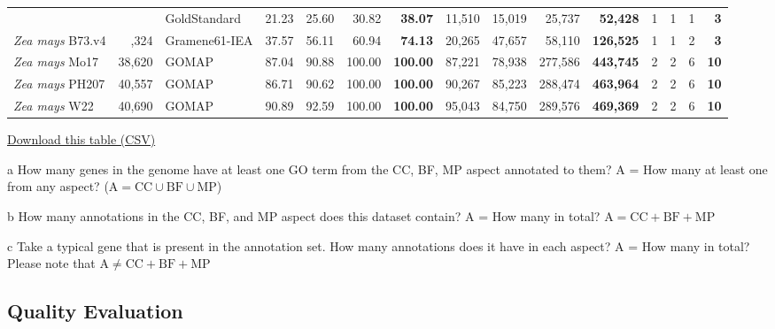 \documentclass[utf8]{frontiersSCNS}
\begin{document}
\begin{table}[t]
{\begin{threeparttable}
\begin{tabular}{lrlrrr>{\bfseries}r|rrr>{\bfseries}r|rrr>{\bfseries}r}
\rowcolor{gray!6}   &  & GoldStandard & 21.23 & 25.60 & 30.82 & 38.07 & 11,510 & 15,019 & 25,737 & 52,428 & 1 & 1 & 1 & 3\\

\multirow{-3}{*}{\raggedright\arraybackslash \textit{Zea mays} B73.v4} & \multirow{-3}{*}{\raggedleft\arraybackslash 39,324} & Gramene61-IEA & 37.57 & 56.11 & 60.94 & 74.13 & 20,265 & 47,657 & 58,110 & 126,525 & 1 & 1 & 2 & 3\\
\cmidrule{1-15}
\rowcolor{gray!6}  \textit{Zea mays} Mo17 & 38,620 & GOMAP & 87.04 & 90.88 & 100.00 & 100.00 & 87,221 & 78,938 & 277,586 & 443,745 & 2 & 2 & 6 & 10\\
\cmidrule{1-15}
\textit{Zea mays} PH207 & 40,557 & GOMAP & 86.71 & 90.62 & 100.00 & 100.00 & 90,267 & 85,223 & 288,474 & 463,964 & 2 & 2 & 6 & 10\\
\cmidrule{1-15}
\rowcolor{gray!6}  \textit{Zea mays} W22 & 40,690 & GOMAP & 90.89 & 92.59 & 100.00 & 100.00 & 95,043 & 84,750 & 289,576 & 469,369 & 2 & 2 & 6 & 10\\
\bottomrule
\end{tabular}
\begin{tablenotes}
\item \href{https://raw.githubusercontent.com/Dill-PICL/GOMAP-Paper-2019.1/master/analyses/quantity/results/quantity_table.csv}{Download this table (CSV)}
\item[a] How many genes in the genome have at least one GO term from the CC, BF, MP aspect annotated to them? A = How many at least one from any aspect? ($\textrm{A} = \textrm{CC} \cup \textrm{BF} \cup \textrm{MP}$)
\item[b] How many annotations in the CC, BF, and MP aspect does this dataset contain? A = How many in total? $\textrm{A} = \textrm{CC} + \textrm{BF} + \textrm{MP}$
\item[c] Take a typical gene that is present in the annotation set. How many annotations does it have in each aspect? A = How many in total? Please note that $\textrm{A} \neq \textrm{CC} + \textrm{BF} +\textrm{MP}$
\end{tablenotes}
\end{threeparttable}}
\end{table}

\hypertarget{quality-evaluation-1}{%
\subsection{Quality Evaluation}\label{quality-evaluation-1}}
\end{document}
